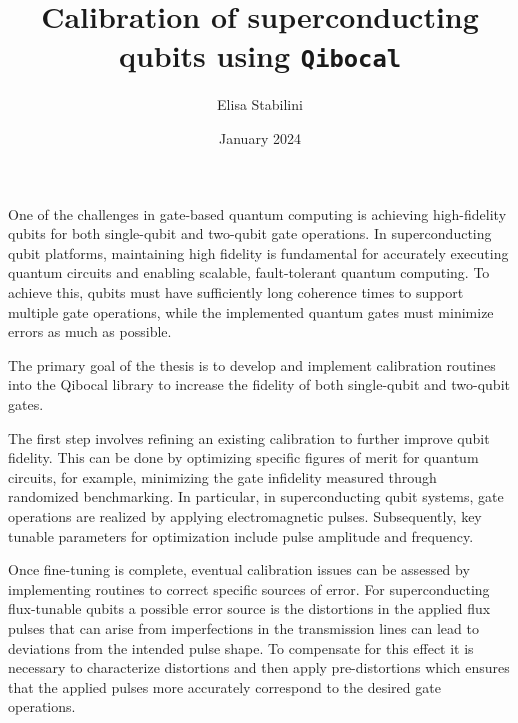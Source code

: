 \documentclass{article}
\title{Calibration of superconducting qubits using \tt{Qibocal}}
\author{Elisa Stabilini}
\date{January 2024}
\begin{document}
One of the challenges in gate-based quantum computing is achieving high-fidelity qubits for both single-qubit and two-qubit gate operations. In superconducting qubit platforms, maintaining high fidelity is fundamental for accurately executing quantum circuits and enabling scalable, fault-tolerant quantum computing. To achieve this, qubits must have sufficiently long coherence times to support multiple gate operations, while the implemented quantum gates must minimize errors as much as possible.

The primary goal of the thesis is to develop and implement calibration routines into the Qibocal library to increase the fidelity of both single-qubit and two-qubit gates. 

The first step involves refining an existing calibration to further improve qubit fidelity. 
This can be done by optimizing specific figures of merit for quantum circuits, for example, minimizing the gate infidelity measured through randomized benchmarking. 
In particular, in superconducting qubit systems, gate operations are realized by applying electromagnetic pulses. Subsequently, key tunable parameters for optimization include pulse amplitude and frequency. 

Once fine-tuning is complete, eventual calibration issues can be assessed by implementing routines to correct specific sources of error. For superconducting flux-tunable qubits a possible error source is the distortions in the applied flux pulses that can arise from imperfections in the transmission lines can lead to deviations from the intended pulse shape. To compensate for this effect it is necessary to characterize distortions and then apply pre-distortions which ensures that the applied pulses more accurately correspond to the desired gate operations.
\end{document}
